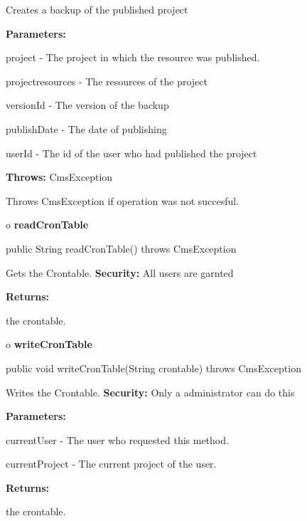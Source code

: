 \begin{description}
\htmlDD Creates a backup of the published project 

\begin{description}
\item {\bf Parameters:}  

project - The project in which the resource was published.  

projectresources - The resources of the project  

versionId - The version of the backup  

publishDate - The date of publishing  

userId - The id of the user who had published the project  
\item {\bf Throws:} CmsException  

Throws CmsException if operation was not succesful.  
\end{description}

\end{description}

o {\bf readCronTable} 

\begin{PRE}
 public String readCronTable() throws CmsException
\end{PRE}

\begin{description}
\htmlDD Gets the Crontable. {\bf Security:} All users are garnted 

\begin{description}
\item {\bf Returns:}  

the crontable.  
\end{description}

\end{description}

o {\bf writeCronTable} 

\begin{PRE}
 public void writeCronTable(String crontable) throws CmsException
\end{PRE}

\begin{description}
\htmlDD Writes the Crontable. {\bf Security:} Only a administrator can do this


\begin{description}
\item {\bf Parameters:}  

currentUser - The user who requested this method.  

currentProject - The current project of the user.  
\item {\bf Returns:}  

the crontable.  
\end{description}

\end{description}

